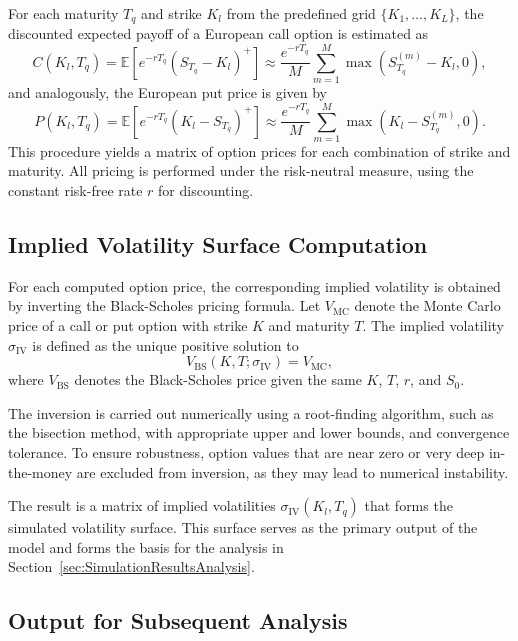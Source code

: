 For each maturity $T_q$ and strike $K_l$ from the predefined grid $\{K_1,\ldots,K_L\}$, the discounted expected payoff of a European call option is estimated as
\begin{equation}
    C(K_l, T_q) = \mathbb{E}\left[ e^{-rT_q} (S_{T_q} - K_l)^+ \right] \approx \frac{e^{-rT_q}}{M} \sum_{m=1}^M \max\left(S_{T_q}^{(m)} - K_l, 0\right),
\end{equation}
and analogously, the European put price is given by
\begin{equation}
    P(K_l, T_q) = \mathbb{E}\left[ e^{-rT_q} (K_l - S_{T_q})^+ \right] \approx \frac{e^{-rT_q}}{M} \sum_{m=1}^M \max\left(K_l - S_{T_q}^{(m)}, 0\right).
\end{equation}
This procedure yields a matrix of option prices for each combination of strike and maturity. All pricing is performed under the risk-neutral measure, using the constant risk-free rate $r$ for discounting.


\subsection{Implied Volatility Surface Computation} \label{subsec:ImpliedVolaSurfaceComputation}

For each computed option price, the corresponding implied volatility is obtained by inverting the Black-Scholes pricing formula. Let $V_{\text{MC}}$ denote the Monte Carlo price of a call or put option with strike $K$ and maturity $T$. The implied volatility $\sigma_{\text{IV}}$ is defined as the unique positive solution to
\begin{equation}
    V_{\text{BS}}(K, T; \sigma_{\text{IV}}) = V_{\text{MC}},
\end{equation}
where $V_{\text{BS}}$ denotes the Black-Scholes price given the same $K$, $T$, $r$, and $S_0$.

The inversion is carried out numerically using a root-finding algorithm, such as the bisection method, with appropriate upper and lower bounds, and convergence tolerance. To ensure robustness, option values that are near zero or very deep in-the-money are excluded from inversion, as they may lead to numerical instability.

The result is a matrix of implied volatilities $\sigma_{\text{IV}}(K_l,T_q)$ that forms the simulated volatility surface. This surface serves as the primary output of the model and forms the basis for the analysis in Section~\ref{sec:SimulationResultsAnalysis}.


\subsection{Output for Subsequent Analysis} \label{subsec:OutputSubsequentAnalysis}

